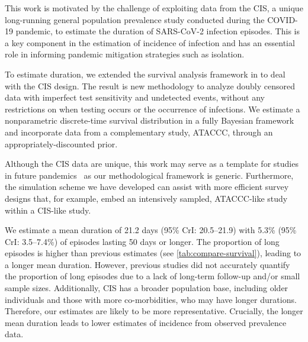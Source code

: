 \documentclass[referee,useAMS,usenatbib]{biom}
\begin{document}
This work is motivated by the challenge of exploiting data from the CIS, a unique long-running general population prevalence study conducted during the COVID-19 pandemic, to estimate the duration of SARS-CoV-2 infection episodes.
This is a key component in the estimation of incidence of infection and has an essential role in informing pandemic mitigation strategies such as isolation.

To estimate duration, we extended the survival analysis framework in \citet{heiseyModelling} to deal with the CIS design.
The result is new methodology to analyze doubly censored data with imperfect test sensitivity and undetected events, without any restrictions on when testing occurs or the occurrence of infections.
We estimate a nonparametric discrete-time survival distribution in a fully Bayesian framework and incorporate data from a complementary study, ATACCC, through an appropriately-discounted prior.

Although the CIS data are unique, this work may serve as a template for studies in future pandemics~\citep{hallettModule} as
our methodological framework is generic.
Furthermore, the simulation scheme we have developed can assist with  more efficient survey designs that, for example, embed an intensively sampled, ATACCC-like study within a CIS-like study.

We estimate a mean duration of 21.2 days (95\% CrI: 20.5--21.9) with 5.3\% (95\% CrI: 3.5--7.4\%) of episodes lasting 50 days or longer.
The proportion of long episodes is higher than previous estimates (see \cref{tab:compare-survival}), leading to a longer mean duration.
However, previous studies did not accurately quantify the proportion of long episodes due to a lack of long-term follow-up and/or small sample sizes.
Additionally, CIS has a broader population base, including older individuals and those with more co-morbidities, who may have longer durations.
Therefore, our estimates are likely to be more representative.
Crucially, the longer mean duration leads to lower estimates of incidence from observed prevalence data.
\end{document}
